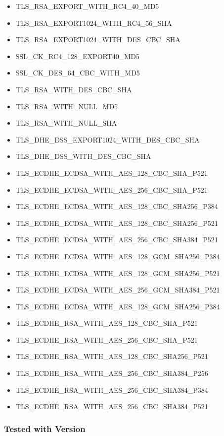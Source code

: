 \begin{itemize}
\item TLS_RSA_EXPORT_WITH_RC4_40_MD5
\item TLS_RSA_EXPORT1024_WITH_RC4_56_SHA
\item TLS_RSA_EXPORT1024_WITH_DES_CBC_SHA
\item SSL_CK_RC4_128_EXPORT40_MD5
\item SSL_CK_DES_64_CBC_WITH_MD5
\item TLS_RSA_WITH_DES_CBC_SHA
\item TLS_RSA_WITH_NULL_MD5
\item TLS_RSA_WITH_NULL_SHA
\item TLS_DHE_DSS_EXPORT1024_WITH_DES_CBC_SHA
\item TLS_DHE_DSS_WITH_DES_CBC_SHA
\item TLS_ECDHE_ECDSA_WITH_AES_128_CBC_SHA_P521
\item TLS_ECDHE_ECDSA_WITH_AES_256_CBC_SHA_P521
\item TLS_ECDHE_ECDSA_WITH_AES_128_CBC_SHA256_P384
\item TLS_ECDHE_ECDSA_WITH_AES_128_CBC_SHA256_P521
\item TLS_ECDHE_ECDSA_WITH_AES_256_CBC_SHA384_P521
\item TLS_ECDHE_ECDSA_WITH_AES_128_GCM_SHA256_P384
\item TLS_ECDHE_ECDSA_WITH_AES_128_GCM_SHA256_P521
\item TLS_ECDHE_ECDSA_WITH_AES_256_GCM_SHA384_P521
\item TLS_ECDHE_ECDSA_WITH_AES_128_GCM_SHA256_P384
\item TLS_ECDHE_RSA_WITH_AES_128_CBC_SHA_P521
\item TLS_ECDHE_RSA_WITH_AES_256_CBC_SHA_P521
\item TLS_ECDHE_RSA_WITH_AES_128_CBC_SHA256_P521
\item TLS_ECDHE_RSA_WITH_AES_256_CBC_SHA384_P256
\item TLS_ECDHE_RSA_WITH_AES_256_CBC_SHA384_P384
\item TLS_ECDHE_RSA_WITH_AES_256_CBC_SHA384_P521
\end{itemize}


\subsubsection{Tested with Version} 

